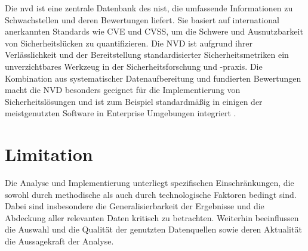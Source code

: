 \par Die \gls{nvd} ist eine zentrale Datenbank des \gls{nist}, die umfassende Informationen zu Schwachstellen und deren Bewertungen liefert. Sie basiert auf international anerkannten Standards wie CVE und CVSS, um die Schwere und Ausnutzbarkeit von Sicherheitslücken zu quantifizieren. Die NVD ist aufgrund ihrer Verlässlichkeit  und der Bereitstellung standardisierter Sicherheitsmetriken ein unverzichtbares Werkzeug in der Sicherheitsforschung und -praxis. Die Kombination aus systematischer Datenaufbereitung und fundierten Bewertungen macht die NVD besonders geeignet für die Implementierung von Sicherheitslösungen und ist zum Beispiel standardmäßig in einigen der meistgenutzten Software in Enterprise Umgebungen integriert \autocite{AssetsNVDIntegration} \autocite{InformationenNVDIntegrationen}.

\section{Limitation}
\label{sec:limitationen}
Die Analyse und Implementierung unterliegt spezifischen Einschränkungen, die sowohl durch methodische als auch durch technologische Faktoren bedingt sind. Dabei sind insbesondere die Generalisierbarkeit der Ergebnisse und die Abdeckung aller relevanten Daten kritisch zu betrachten.  Weiterhin beeinflussen die Auswahl und die Qualität der genutzten Datenquellen sowie deren Aktualität die Aussagekraft der Analyse. 
